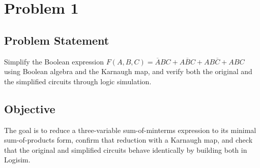 \documentclass[12pt,a4paper]{article}
\begin{document}
\pagestyle{fancy}
\fancyhf{}
\fancyfoot[C]{\thepage}
\renewcommand{\headrulewidth}{0.4pt}

\titleformat{\section}{\normalfont\Large\bfseries}{\thesection}{1em}{}
\titleformat{\subsection}{\normalfont\large\bfseries}{\thesubsection}{1em}{}
\titlespacing*{\subsection}{0pt}{1.1em}{0.5em}

\newcommand{\bA}{\overline{A}}
\newcommand{\bB}{\overline{B}}
\newcommand{\bC}{\overline{C}}


\setcounter{page}{2}
\pagestyle{reportstyle}

\vspace{1em}

\clearpage
\section*{Problem 1}

\subsection*{Problem Statement}
Simplify the Boolean expression $F(A,B,C) = \bA BC + A\bB C + AB\bC + ABC$ using Boolean algebra and the Karnaugh map, and verify both the original and the simplified circuits through logic simulation.

\subsection*{Objective}
The goal is to reduce a three-variable sum-of-minterms expression to its minimal sum-of-products form, confirm that reduction with a Karnaugh map, and check that the original and simplified circuits behave identically by building both in Logisim.
\end{document}
